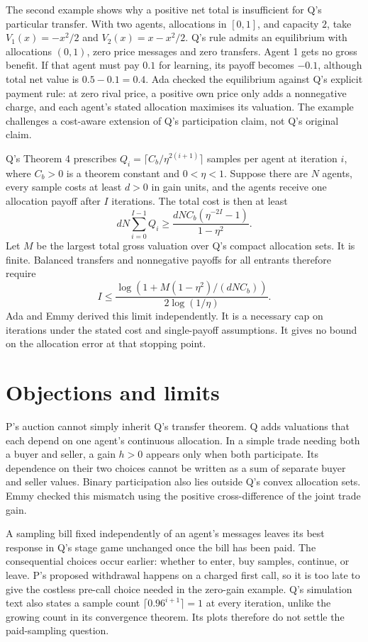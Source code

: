 \documentclass{article}
\begin{document}
The second example shows why a positive net total is insufficient for Q's particular transfer. With
two agents, allocations in \([0,1]\), and capacity \(2\), take \(V_1(x)=-x^2/2\) and
\(V_2(x)=x-x^2/2\). Q's rule admits an equilibrium with allocations \((0,1)\), zero price messages
and zero transfers. Agent 1 gets no gross benefit. If that agent must pay \(0.1\) for learning, its
payoff becomes \(-0.1\), although total net value is \(0.5-0.1=0.4\). Ada checked the equilibrium
against Q's explicit payment rule: at zero rival price, a positive own price only adds a nonnegative
charge, and each agent's stated allocation maximises its valuation. The example challenges a
cost-aware extension of Q's participation claim, not Q's original claim.

Q's Theorem 4 prescribes \(Q_i=\lceil C_b/\eta^{2(i+1)}\rceil\) samples per agent at iteration
\(i\), where \(C_b>0\) is a theorem constant and \(0<\eta<1\). Suppose there are \(N\) agents, every
sample costs at least \(d>0\) in gain units, and the agents receive one allocation payoff after
\(I\) iterations.
The total cost is then at least
\[
dN\sum_{i=0}^{I-1}Q_i
\geq \frac{dNC_b(\eta^{-2I}-1)}{1-\eta^2}.
\]
Let \(M\) be the largest total gross valuation over Q's compact allocation sets. It is finite.
Balanced transfers and nonnegative payoffs for all entrants therefore require
\[
I\leq
\frac{\log\!\left(1+M(1-\eta^2)/(dNC_b)\right)}
{2\log(1/\eta)}.
\]
Ada and Emmy derived this limit independently. It is a necessary cap on iterations under the stated
cost and single-payoff assumptions. It gives no bound on the allocation error at that stopping
point.

\section{Objections and limits}

P's auction cannot simply inherit Q's transfer theorem. Q adds valuations that each depend on one
agent's continuous allocation. In a simple trade needing both a buyer and seller, a gain \(h>0\)
appears only when both participate. Its dependence on their two choices cannot be written as a sum
of separate buyer and seller values. Binary participation also lies outside Q's convex allocation
sets. Emmy checked this mismatch using the positive cross-difference of the joint trade gain.

A sampling bill fixed independently of an agent's messages leaves its best response in Q's stage
game unchanged once the bill has been paid. The consequential choices occur earlier: whether to
enter, buy samples, continue, or leave. P's proposed withdrawal happens on a charged first call, so
it is too late to give the costless pre-call choice needed in the zero-gain example. Q's simulation
text also states a sample count \(\lceil0.96^{i+1}\rceil=1\) at every iteration, unlike the growing
count in its convergence theorem. Its plots therefore do not settle the paid-sampling question.
\end{document}
